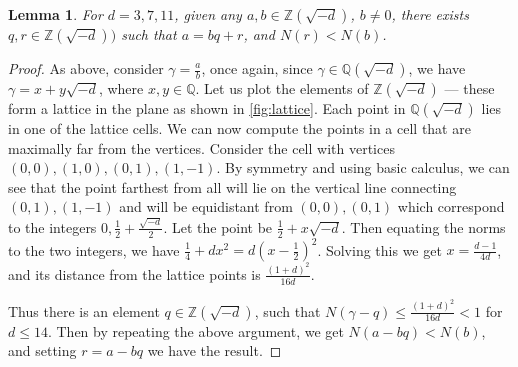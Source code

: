 \documentclass[12pt]{article}
\newcommand{\ints}{{\mathbb{Z}}}
\newcommand{\qf}{{\mathbb{Q}}}
\newtheorem{lemma}[thm]{Lemma}
\begin{document}
\begin{lemma}
For $d = 3, 7, 11$, given any $a, b \in \ints(\sqrt{-d})$, $b \neq 0$, there exists $q, r \in \ints(\sqrt{-d}))$ such that $a = bq + r$, and $N(r) < N(b)$.
\end{lemma}
\begin{proof}
As above, consider $\gamma = \frac{a}{b}$, once again, since $\gamma \in \qf(\sqrt{-d})$, we have $\gamma = x + y\sqrt{-d}$, where $x, y \in \qf$. Let us plot the elements of $\ints(\sqrt{-d})$ --- these form a lattice in the plane as shown in \cref{fig:lattice}.  Each point in $\qf(\sqrt{-d})$ lies in one of the lattice cells. We can now compute the points in a cell that are maximally far from the vertices.  Consider the cell with vertices $(0,0), (1,0), (0,1), (1,-1)$.  By symmetry and using basic calculus, we can see that the point farthest from all will lie on the vertical line connecting $(0,1), (1, -1)$ and will be equidistant from $(0,0), (0,1)$ which correspond to the integers $0, \frac{1}{2} + \frac{\sqrt{-d}}{2}$.  Let the point be $\frac{1}{2} + x\sqrt{-d}$.  Then equating the norms to the two integers, we have $\frac{1}{4} + dx^2 = d(x - \frac{1}{2})^2$. Solving this we get $x = \frac{d-1}{4d}$, and its distance from the lattice points is $\frac{(1 + d)^2}{16d}$.

Thus there is an element $q \in \ints(\sqrt{-d})$, such that $N(\gamma - q) \leq \frac{(1 + d)^2}{16d} < 1$ for $d \leq 14$. Then by repeating the above argument, we get $N(a - bq) < N(b)$, and setting $r = a-bq$ we have the result.

\end{proof}
\end{document}
